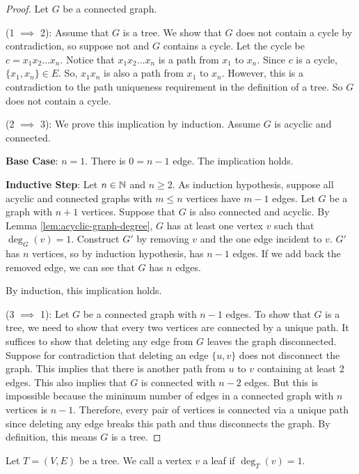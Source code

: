 \begin{proof}
    Let $G$ be a connected graph.

    (1 $\implies$ 2): Assume that $G$ is a tree. We show that $G$ does not contain a cycle by contradiction, so suppose not and $G$ contains a cycle. Let the cycle be $c = x_1x_2\ldots x_n$. Notice that $x_1x_2\ldots x_n$ is a path from $x_1$ to $x_n$. Since $c$ is a cycle, $\{x_1,x_n\} \in E$. So, $x_1x_n$ is also a path from $x_1$ to $x_n$. However, this is a contradiction to the path uniqueness requirement in the definition of a tree. So $G$ does not contain a cycle.

    (2 $\implies$ 3): We prove this implication by induction. Assume $G$ is acyclic and connected.

    \textbf{Base Case}: $n = 1$. There is $0 = n-1$ edge. The implication holds.

    \textbf{Inductive Step}: Let $n \in \mathbb{N}$ and $n \geq 2$. As induction hypothesis, suppose all acyclic and connected graphs with $m \leq n$ vertices have $m-1$ edges. Let $G$ be a graph with $n+1$ vertices. Suppose that $G$ is also connected and acyclic. By Lemma \ref{lem:acyclic-graph-degree}, $G$ has at least one vertex $v$ such that $\deg_G(v) = 1$. Construct $G'$ by removing $v$ and the one edge incident to $v$. $G'$ has $n$ vertices, so by induction hypothesis, has $n-1$ edges. If we add back the removed edge, we can see that $G$ has $n$ edges.

    By induction, this implication holds.

    (3 $\implies$ 1): Let $G$ be a connected graph with $n-1$ edges. To show that $G$ is a tree, we need to show that every two vertices are connected by a unique path. It suffices to show that deleting any edge from $G$ leaves the graph disconnected. Suppose for contradiction that deleting an edge $\{u,v\}$ does not disconnect the graph. This implies that there is another path from $u$ to $v$ containing at least 2 edges. This also implies that $G$ is connected with $n-2$ edges. But this is impossible because the minimum number of edges in a connected graph with $n$ vertices is $n-1$. Therefore, every pair of vertices is connected via a unique path since deleting any edge breaks this path and thus disconnects the graph. By definition, this means $G$ is a tree.
\end{proof}

\begin{definition}
    Let $T = (V,E)$ be a tree. We call a vertex $v$ a leaf if $\deg_T(v) = 1$.
\end{definition}


